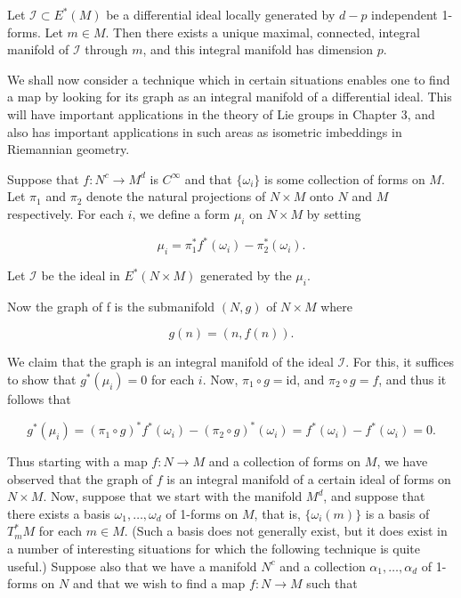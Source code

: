 \begin{theorem}\label{thm:2.32}
Let $\mathcal{I} \subset E^{*}(M)$ be a differential ideal locally generated by $d-p$ independent 1-forms. Let $m \in M$. Then there exists a unique maximal, connected, integral manifold of $\mathcal{I}$ through $m$, and this integral manifold has dimension $p$.

\end{theorem}

\label{thm:2.33} We shall now consider a technique which in certain situations enables one to find a map by looking for its graph as an integral manifold of a differential ideal. This will have important applications in the theory of Lie groups in Chapter 3, and also has important applications in such areas as isometric imbeddings in Riemannian geometry.

Suppose that $f\colon N^{c}\to M^{d}$ is $C^{\infty}$ and that $\{\omega_{i}\}$ is some collection of forms on $M$. Let $\pi_{1}$ and $\pi_{2}$ denote the natural projections of $N\times M$ onto $N$ and $M$ respectively. For each $i$, we define a form $\mu_{i}$ on $N\times M$ by setting

\begin{equation}
\tag{1}\label{eq:2.33:1}
\mu_{i}=\pi_{1}^{*}f^{*}(\omega_{i})-\pi_{2}^{*}(\omega_{i}).
\end{equation}

Let  $ \mathcal{I} $ be the ideal in  $ E^{*}(N \times M) $ generated by the  $ \mu_i $.

Now the graph of f is the submanifold $(N,g)$ of $N\times M$ where 

\begin{equation}
\tag{2}\label{eq:2.33:2}
g(n)=(n,f(n)).
\end{equation}

We claim that the graph is an integral manifold of the ideal $\mathcal{I}$. For this, it suffices to show that $g^{*}(\mu_{i})=0$ for each $i$. Now, $\pi_{1}\circ g=\mathrm{id}$, and $\pi_{2}\circ g=f$, and thus it follows that

\[
g^{*}(\mu_{i})=(\pi_{1}\circ g)^{*}f^{*}(\omega_{i})-(\pi_{2}\circ g)^{*}(\omega_{i})=f^{*}(\omega_{i})-f^{*}(\omega_{i})=0.
\]

Thus starting with a map $f\colon N\to M$ and a collection of forms on $M$, we have observed that the graph of $f$ is an integral manifold of a certain ideal of forms on $N\times M$. Now, suppose that we start with the manifold $M^d$, and suppose that there exists a basis $\omega_1,\ldots,\omega_d$ of 1-forms on $M$, that is, $\{\omega_i(m)\}$ is a basis of $T_{m}^{*} M$ for each $m\in M$. (Such a basis does not generally exist, but it does exist in a number of interesting situations for which the following technique is quite useful.) Suppose also that we have a manifold $N^c$ and a collection $\alpha_1,\ldots,\alpha_d$ of 1-forms on $N$ and that we wish to find a map $f\colon N\to M$ such that

